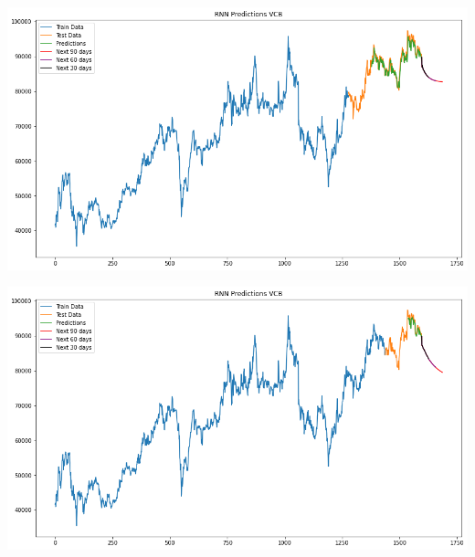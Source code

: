 \documentclass[conference]{IEEEtran}
\begin{document}
\begin{minipage}{0.23\textwidth}
    \centering
    \includegraphics[width=\linewidth]{images/RNN/RNN_VCB_82.png}
    \label{fig:image1}
\end{minipage}
\hfill
\begin{minipage}{0.23\textwidth}
    \centering
    \includegraphics[width=\linewidth]{images/RNN/RNN_VCB_91.png}
    \label{fig:image2}
\end{minipage}
\end{document}
